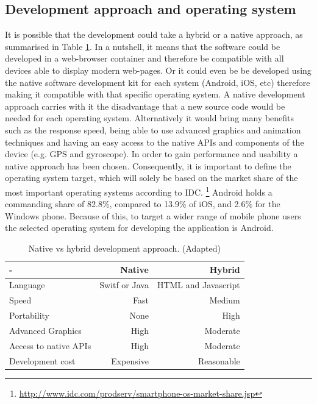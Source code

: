 \subsection{Development approach and operating system}
It is possible that the development could take a hybrid or a native approach, as summarised in Table \ref{tab:development_approaches}. In a nutshell, it means that the software could be developed in a web-browser container and therefore be compatible with all devices able to display modern web-pages. Or it could even be be developed using the native software development kit for each system (Android, iOS, etc) therefore making it compatible with that specific operating system. A native development approach carries with it the disadvantage that a new source code would be needed for each operating system. Alternatively it would bring many benefits such as the response speed, being able to use advanced graphics and animation techniques and having an easy access to the native APIs and components of the device (e.g. GPS and gyroscope). In order to gain performance and usability a native approach has been chosen. Consequently, it is important to define the operating system target, which will solely be based on the market share of the most important operating systems according to IDC. \footnote{\url{http://www.idc.com/prodserv/smartphone-os-market-share.jsp}} Android holds a commanding share of 82.8\%, compared to 13.9\% of iOS, and 2.6\% for the Windows phone. Because of this, to target a wider range of mobile phone users the selected operating system for developing the application is Android.

\begin{table}[ht]
\centering
\begin{adjustbox}{width=.6\textwidth,center=\textwidth}
\begin{tabular}{lrr}
  \hline
   - & Native & Hybrid  \\ \hline
   Language & Switf or Java & HTML and Javascript \\
   Speed & Fast & Medium \\
   Portability & None & High \\
   Advanced Graphics & High & Moderate \\
   Access to native APIs & High & Moderate \\
   Development cost & Expensive & Reasonable \\
   \hline
\end{tabular}
\end{adjustbox}
  \caption[Native vs hybrid development approach ]{Native vs hybrid development approach. (Adapted) \footnotemark }
\label{tab:development_approaches}
\end{table} 

